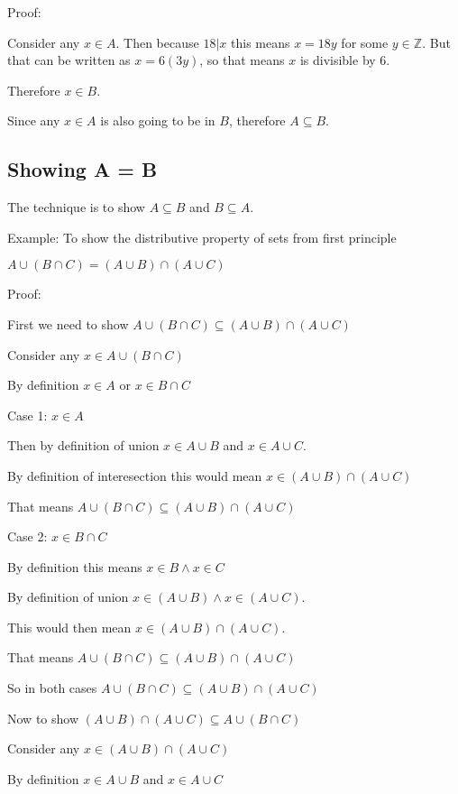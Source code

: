 \documentclass[12pt]{article}
\begin{document}
Proof: 

Consider any $x \in A$. Then because $18|x$ this means $x = 18y$ for some $y \in \mathbb{Z}$. But that can be written as $x = 6(3y)$, so that means $x$ is divisible by 6.

Therefore $x \in B$.

Since any $x \in A$ is also going to be in $B$, therefore $A \subseteq B$.  

\subsection*{Showing A = B}

The technique is to show $A \subseteq B$ and $B \subseteq A$.



Example: To show the distributive property of sets from first principle

$A \cup (B \cap C) = (A \cup B ) \cap (A \cup C)$

Proof:

First we need to show $A \cup (B \cap C) \subseteq (A \cup B ) \cap (A \cup C)$

Consider any $x \in A \cup (B \cap C)$

By definition $x \in A$ or $x \in B \cap C$

Case 1: $x \in A$

Then by definition of union $x \in A \cup B $ and $x \in A \cup C$. 

By definition of interesection this would mean $x \in (A \cup B) \cap (A \cup C)$

That means $A \cup (B \cap C) \subseteq (A \cup B ) \cap (A \cup C)$

Case 2:  $x \in B \cap C$

By definition this means $x \in B \wedge x \in C$

By definition of union $x \in (A \cup B) \wedge x \in (A \cup C)$.

This would then mean $ x \in (A \cup B) \cap (A \cup C)$.

That means $A \cup (B \cap C) \subseteq (A \cup B ) \cap (A \cup C)$

So in both cases $A \cup (B \cap C) \subseteq (A \cup B ) \cap (A \cup C)$

\medskip

Now to show $(A \cup B ) \cap (A \cup C) \subseteq A \cup (B \cap C)$

Consider any $x \in (A \cup B ) \cap (A \cup C)$

By definition $x \in A \cup B$ and $ x \in A \cup C$
\end{document}
